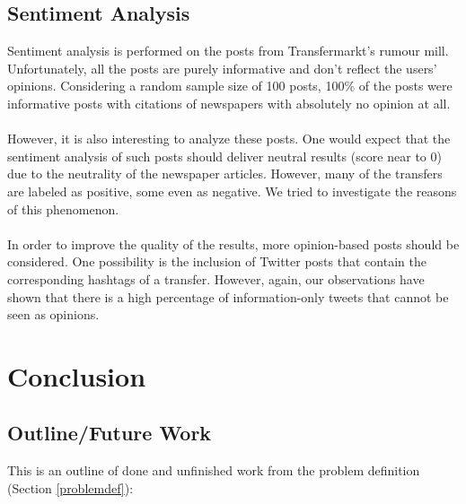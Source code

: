\documentclass{article}
\begin{document}
\subsection{Sentiment Analysis}
\label{eval:sen}
Sentiment analysis is performed on the posts from Transfermarkt's rumour mill. Unfortunately, all the posts are purely informative and don't reflect the users' opinions. Considering a random sample size of 100 posts, 100\% of the posts were informative posts with citations of newspapers with absolutely no opinion at all. 
\\ \\
However, it is also interesting to analyze these posts. One would expect that the sentiment analysis of such posts should deliver neutral results (score near to 0) due to the neutrality of the newspaper articles. However, many of the transfers are labeled as positive, some even as negative. We tried to investigate the reasons of this phenomenon. 
\\ \\
In order to improve the quality of the results, more opinion-based posts should be considered. One possibility is the inclusion of Twitter posts that contain the corresponding hashtags of a transfer. However, again, our observations have shown that there is a high percentage of information-only tweets that cannot be seen as opinions.

\section{Conclusion}
\label{concl}
\subsection{Outline/Future Work}
This is an outline of done and unfinished work from the problem definition (Section \ref{problemdef}):
\end{document}
